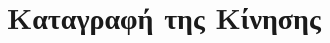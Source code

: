 \documentclass[8pt,sans,mathserif]{beamer}%
\newcommand{\eng}[1]{\selectlanguage{english}#1\selectlanguage{greek}}
\begin{document}
%
%
%

\section{Καταγραφή της Κίνησης}
\frame{\tableofcontents[currentsection]}
\end{document}
